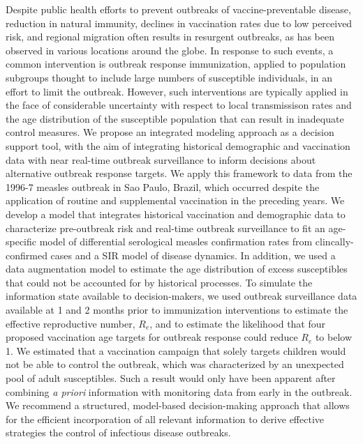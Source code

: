 Despite public health efforts to prevent outbreaks of vaccine-preventable disease, reduction in natural immunity, declines in vaccination rates due to low perceived risk, and regional migration often results in resurgent outbreaks, as has been observed in various locations around the globe. In response to such events, a common intervention is outbreak response immunization, applied to population subgroups thought to include large numbers of susceptible individuals, in an effort to limit the outbreak. However, such interventions are typically applied in the face of considerable uncertainty with respect to local transmissison rates and the age distribution of the susceptible population that can result in inadequate control measures. We propose an integrated modeling approach as a decision support tool, with the aim of integrating historical demographic and vaccination data with near real-time outbreak surveillance to inform decisions about alternative outbreak response targets. We apply this framework to data from the 1996-7 measles outbreak in Sao Paulo, Brazil, which occurred despite the application of routine and supplemental vaccination in the preceding years. We develop a model that integrates historical vaccination and demographic data to characterize pre-outbreak risk and real-time outbreak surveillance to fit an age-specific model of differential serological measles confirmation rates from clincally-confirmed cases and a SIR model of disease dynamics.  In addition, we used a data augmentation model to estimate the age distribution of excess susceptibles that could not be accounted for by historical processes. To simulate the information state available to decision-makers, we used outbreak surveillance data available at 1 and 2 months prior to immunization interventions to estimate the effective reproductive number, \(R_e\), and to estimate the likelihood that four proposed vaccination age targets for outbreak response could reduce \(R_e\) to below 1.  We estimated that a vaccination campaign that solely targets children would not be able to control the outbreak, which was characterized by an unexpected pool of adult susceptibles. Such a result would only have been apparent after combining \textit{a priori} information with monitoring data from early in the outbreak. We recommend a structured, model-based decision-making approach that allows for the efficient incorporation of all relevant information to derive effective strategies the control of infectious disease outbreaks.